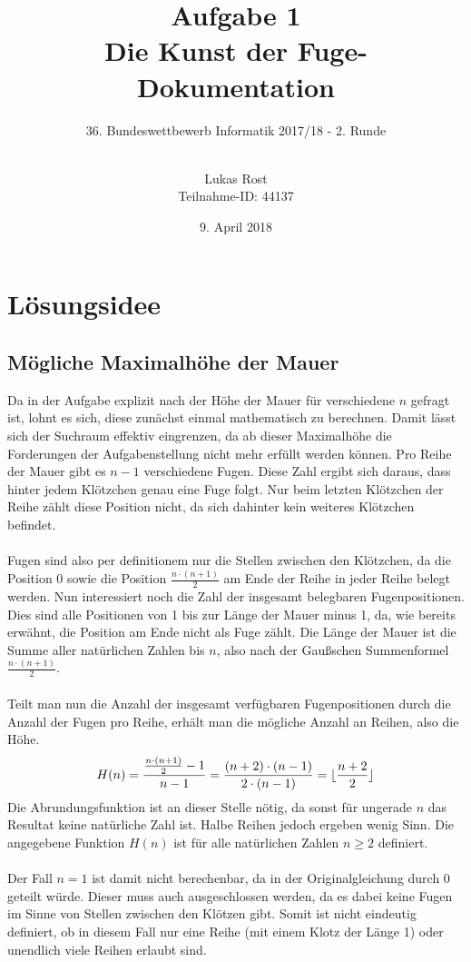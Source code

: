 \documentclass[a4paper, notitlepage, 12pt]{scrartcl}
\author{Lukas Rost \\ \small{Teilnahme-ID: 44137}}
\title{Aufgabe 1 \\ \glqq Die Kunst der Fuge\grqq  - Dokumentation}
\subtitle{36. Bundeswettbewerb Informatik 2017/18 - 2. Runde \\~\\}
\date{9. April 2018}
\DeclarePairedDelimiter\floor{\lfloor}{\rfloor}
\begin{document}
\renewcommand{\contentsname}{\centerline{Inhaltsverzeichnis}}
 \maketitle
 \tableofcontents
 \thispagestyle{empty}
 \newpage
 \setcounter{page}{1}
 
 \section{Lösungsidee}
 \subsection{Mögliche Maximalhöhe der Mauer}
 Da in der Aufgabe explizit nach der Höhe der Mauer für verschiedene $n$ gefragt ist, lohnt es sich, diese zunächst einmal mathematisch zu berechnen. Damit lässt sich der Suchraum effektiv eingrenzen, da ab dieser Maximalhöhe die Forderungen der Aufgabenstellung nicht mehr erfüllt werden können. Pro Reihe der Mauer gibt es $n-1$ verschiedene Fugen. Diese Zahl ergibt sich daraus, dass hinter jedem Klötzchen genau eine Fuge folgt. Nur beim letzten Klötzchen der Reihe zählt diese Position nicht, da sich dahinter kein weiteres Klötzchen befindet. \\ \\
Fugen sind also per definitionem nur die Stellen zwischen den Klötzchen, da die Position 0 sowie die Position $\frac{n \cdot (n+1) }{2}$ am Ende der Reihe in jeder Reihe belegt werden. Nun interessiert noch die Zahl der insgesamt belegbaren Fugenpositionen. Dies sind alle Positionen von 1 bis zur Länge der Mauer minus 1, da, wie bereits erwähnt, die Position am Ende nicht als Fuge zählt. Die Länge der Mauer ist die Summe aller natürlichen Zahlen bis $n$, also nach der Gaußschen Summenformel $\frac{n \cdot (n+1) }{2}$. \\ \\
Teilt man nun die Anzahl der insgesamt verfügbaren Fugenpositionen durch die Anzahl der Fugen pro Reihe, erhält man die mögliche Anzahl an Reihen, also die Höhe. 
\begin{equation}
H(n) = \frac{\frac{n \cdot (n+1) }{2} - 1}{n - 1} = \frac{(n + 2) \cdot (n - 1)}{2 \cdot (n - 1)} = \floor{\frac{n + 2}{2}}
\end{equation}
Die Abrundungsfunktion ist an dieser Stelle nötig, da sonst für ungerade $n$ das Resultat keine natürliche Zahl ist. Halbe Reihen jedoch ergeben wenig Sinn. Die angegebene Funktion $H(n)$ ist für alle natürlichen Zahlen $ n \geq 2$ definiert. \\ \\
Der Fall $ n = 1$ ist damit nicht berechenbar, da in der Originalgleichung durch 0 geteilt würde. Dieser muss auch ausgeschlossen werden, da es dabei keine Fugen im Sinne von Stellen zwischen den Klötzen gibt. Somit ist nicht eindeutig definiert, ob in diesem Fall nur eine Reihe (mit einem Klotz der Länge 1) oder unendlich viele Reihen erlaubt sind.
\end{document}
